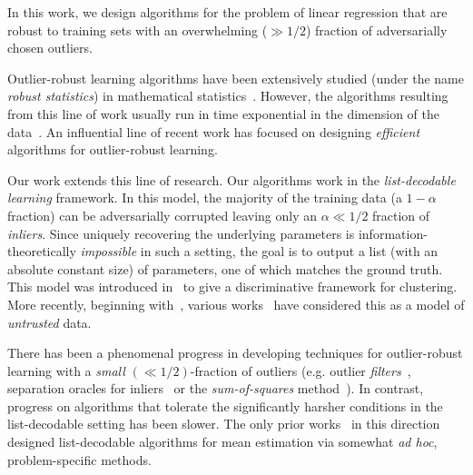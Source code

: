 

In this work, we design algorithms for the problem of linear regression that are robust to training sets with an overwhelming ($\gg 1/2$) fraction of adversarially chosen outliers. 

Outlier-robust learning algorithms have been extensively studied (under the name \emph{robust statistics}) in mathematical statistics~\cite{MR0426989,maronna2006robust,huber2011robust,hampel2011robust}. However, the algorithms resulting from this line of work usually run in time exponential in the dimension of the data~\cite{bernholt2006robust}. An influential line of recent work \cite{journals/jmlr/KlivansLS09,journals/corr/AwasthiBL13, DBLP:journals/corr/DiakonikolasKKL16,DBLP:conf/focs/LaiRV16,DBLP:conf/stoc/CharikarSV17,KothariSteinhardt17,2017KS,HopkinsLi17,DBLP:journals/corr/DiakonikolasKK017a,DBLP:journals/corr/DiakonikolasKS17,DBLP:conf/colt/KlivansKM18} has focused on designing \emph{efficient} algorithms for outlier-robust learning. 

Our work extends this line of research. Our algorithms work in the \emph{list-decodable learning} framework. In this model, the majority of the training data (a $1 -\alpha$ fraction) can be adversarially corrupted leaving only an $\alpha \ll 1/2$ fraction of \emph{inliers}. Since uniquely recovering the underlying parameters is information-theoretically \emph{impossible} in such a setting, the goal is to output a list (with an absolute constant size) of parameters, one of which matches the ground truth. This model was introduced in~\cite{DBLP:conf/stoc/BalcanBV08} to give a discriminative framework for clustering. More recently, beginning with~\cite{DBLP:conf/stoc/CharikarSV17}, various works~\cite{DBLP:conf/stoc/DiakonikolasKS18,KothariSteinhardt17} have considered this as a model of \emph{untrusted} data. 

There has been a phenomenal progress in developing techniques for outlier-robust learning with a \emph{small} $(\ll 1/2)$-fraction of outliers (e.g. outlier \emph{filters}~\cite{DBLP:conf/focs/DiakonikolasKK016,DBLP:journals/corr/DiakonikolasKK017a}, separation oracles for inliers~\cite{DBLP:conf/focs/DiakonikolasKK016} or the \emph{sum-of-squares} method~\cite{2017KS,HopkinsLi17,KothariSteinhardt17,DBLP:conf/colt/KlivansKM18}). In contrast, progress on algorithms that tolerate the significantly harsher conditions in the list-decodable setting has been slower. The only prior works~\cite{DBLP:conf/stoc/CharikarSV17,DBLP:conf/stoc/DiakonikolasKS18,KothariSteinhardt17} in this direction designed list-decodable algorithms for mean estimation via somewhat \emph{ad hoc}, problem-specific methods. 

